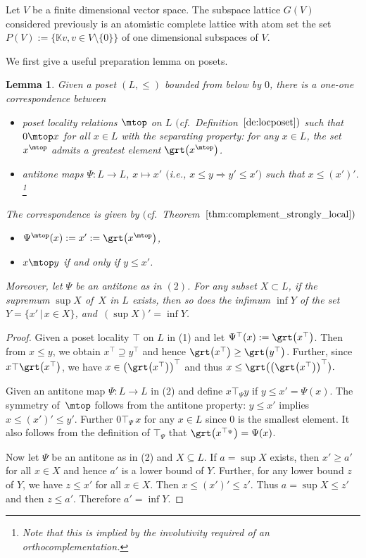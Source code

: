 \documentclass[10pt,a4paper]{amsart}
\numberwithin{equation}{section}
\newtheorem{Lemma}[Theorem]{Lemma}
\newcommand{\K}{\mathbb{K}}
\begin{document}
\begin{Example}Let $V$ be a finite dimensional vector space.
	The subspace lattice $G(V)$ con\-si\-de\-red previously is an atomistic complete lattice with atom set the set $P(V):=\{\K v, v\in V\setminus\{0\}\}$ of one dimensional subspaces of $V$.
\end{Example}
We first give a useful preparation lemma on posets.
\begin{Lemma}\label{lemmaA6}
	Given a poset $(L, \leq)$ bounded from below by $0$, there is a one-one correspondence between
	\begin{itemize}\itemsep=0pt
		\item[$(1)$] {\it poset locality} relations $\mtop$ on $L$
$($cf.\ Definition~$\ref{de:locposet})$ such that $0\mtop x$ for all $x\in L $ with the {\it separating property}: for any $x\in L$, the set $x^\mtop$ admits a greatest element $\grt \big(x^\mtop\big)$.
		\item[$(2)$] {\it antitone} maps $\Psi\colon L\to L$, $x\mapsto x'$ $($i.e., $x\leq y\Rightarrow y'\leq x'$$)$ such that $x\leq (x')'.$\footnote{Note that this is implied by the involutivity required of an orthocomplementation.}
	\end{itemize}
	The correspondence is given by $($cf.\ Theorem~$\ref{thm:complement_strongly_local})$
	\begin{itemize}\itemsep=0pt
		\item $\Psi^\mtop(x):=x':=\grt \big(x^\mtop\big)$,
		\item $x\mtop y$ if and only if $y\leq x'$.
	\end{itemize}
	
	Moreover, let $\Psi$ be an antitone as in $(2)$. For any subset $X\subset L$, if the supremum $\sup X$ of~$X$ in $L$ exists, then so does the infimum $\inf Y$ of the set
	$Y=\{x'\,|\, x\in X\}$, and~$(\sup X)'=\inf Y$.
\end{Lemma}
\begin{proof}
Given a poset locality $\top$ on $L$ in (1) and let $\Psi^\top (x):=\grt \big(x^\top\big)$. Then from $x\leq y$, we obtain $x^\top \supseteq y^\top$ and hence $\grt\big(x^\top\big) \geq \grt\big(y^\top\big)$.
Further, since $x\top \grt \big(x^\top\big)$, we have $x\in \big(\grt\big(x^\top\big)\big)^\top$ and thus
$x\leq \grt\big(\big(\grt\big(x^\top\big)\big)^\top\big).$

Given an antitone map $\Psi\colon L\to L$ in (2) and define $x\top_\Psi y$ if $y\leq x'=\Psi(x)$. The symmetry of~$\mtop$ follows from the antitone property: $y\leq x'$ implies $x\leq (x')'\leq y'$. Further $0\top_\Psi\, x$ for any $x\in L$ since $0$ is the smallest element. It also follows from the definition of $\top_\Psi$ that $\grt \big(x^{\top_\Psi}\big)=\Psi(x)$.

Now let $\Psi$ be an antitone as in (2) and $X\subseteq L$.
If $a=\sup X$ exists, then $x'\geq a'$ for all $x\in X$ and hence $a'$ is a lower bound of $Y$. Further, for any lower bound $z$ of $Y$, we have $z\leq x'$ for all $x\in X$. Then $x\leq (x')'\leq z'$. Thus $a=\sup X\leq z'$ and then $z\leq a'$. Therefore $a'=\inf Y$.
\end{proof}
\end{document}
